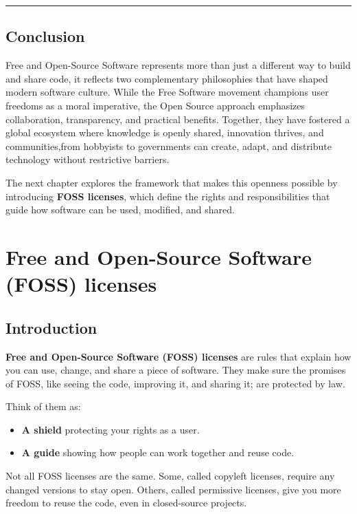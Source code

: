 \documentclass[
  11pt,
  letterpaper,
]{book}
\providecommand{\tightlist}{%
  \setlength{\itemsep}{0pt}\setlength{\parskip}{0pt}}
\begin{document}
\begin{center}\rule{0.5\linewidth}{0.5pt}\end{center}

\section{Conclusion}\label{conclusion-1}

Free and Open-Source Software represents more than just a different way
to build and share code, it reflects two complementary philosophies that
have shaped modern software culture. While the Free Software movement
champions user freedoms as a moral imperative, the Open Source approach
emphasizes collaboration, transparency, and practical benefits.
Together, they have fostered a global ecosystem where knowledge is
openly shared, innovation thrives, and communities,from hobbyists to
governments can create, adapt, and distribute technology without
restrictive barriers.

The next chapter explores the framework that makes this openness
possible by introducing \textbf{FOSS licenses}, which define the rights
and responsibilities that guide how software can be used, modified, and
shared.

\chapter{Free and Open-Source Software (FOSS)
licenses}\label{sec-licenses}

\section{Introduction}\label{introduction}

\textbf{Free and Open-Source Software (FOSS) licenses} are rules that
explain how you can use, change, and share a piece of software. They
make sure the promises of FOSS, like seeing the code, improving it, and
sharing it; are protected by law.

Think of them as:

\begin{itemize}
\tightlist
\item
  \textbf{A shield} protecting your rights as a user.
\item
  \textbf{A guide} showing how people can work together and reuse code.
\end{itemize}

Not all FOSS licenses are the same. Some, called copyleft licenses,
require any changed versions to stay open. Others, called permissive
licenses, give you more freedom to reuse the code, even in closed-source
projects.
\end{document}
